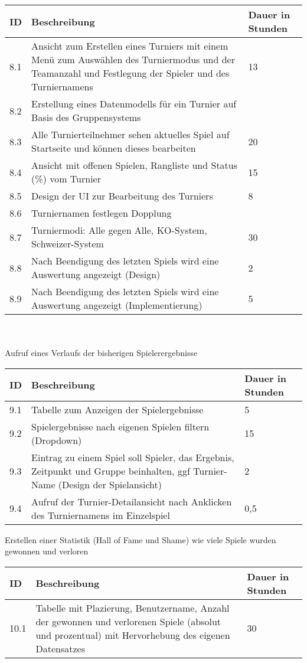 \begin{tabular}[h]{|p{1cm}|p{10cm}|p{3cm}|}
\hline 
ID & Beschreibung & Dauer in Stunden \\ \hline 
8.1	& Ansicht zum Erstellen eines Turniers mit einem Menü zum Auswählen des Turniermodus und der Teamanzahl und Festlegung der Spieler und des Turniernamens & 13\\ \hline
8.2	& Erstellung eines Datenmodells für ein Turnier auf Basis des Gruppensystems & \\ \hline
8.3	& Alle Turnierteilnehmer sehen aktuelles Spiel auf Startseite und können dieses bearbeiten & 20 \\ \hline
8.4 & Ansicht mit offenen Spielen, Rangliste und Status (\%) vom Turnier & 15 \\ \hline	
8.5 & Design der UI zur Bearbeitung des Turniers & 8 \\ \hline
8.6 & Turniernamen festlegen		Dopplung & \\ \hline
8.7 & Turniermodi: Alle gegen Alle, KO-System, Schweizer-System & 30 \\ \hline	
8.8 & Nach Beendigung des letzten Spiels wird eine Auswertung angezeigt (Design) & 2 \\ \hline	
8.9 & Nach Beendigung des letzten Spiels wird eine Auswertung angezeigt (Implementierung) & 5 \\ \hline
\end{tabular}\\ \\
Aufruf eines Verlaufs der bisherigen Spielerergebnisse\\
\begin{tabular}[h]{|p{1cm}|p{10cm}|p{3cm}|}
\hline 
ID & Beschreibung & Dauer in Stunden \\ \hline 
9.1 & Tabelle zum Anzeigen der Spielergebnisse & 5 \\ \hline	
9.2 & Spielergebnisse nach eigenen Spielen filtern (Dropdown) & 15	\\ \hline
9.3 & Eintrag zu einem Spiel soll Spieler, das Ergebnis, Zeitpunkt und Gruppe beinhalten, ggf Turnier-Name (Design der Spielansicht) & 2 \\ \hline	
9.4 & Aufruf der Turnier-Detailansicht nach Anklicken des Turniernamens im Einzelspiel & 0,5 \\ \hline
\end{tabular}\newpage
Erstellen einer Statistik (Hall of Fame und Shame) wie viele Spiele wurden gewonnen und verloren\\
\begin{tabular}[h]{|p{1cm}|p{10cm}|p{3cm}|}
\hline 
ID & Beschreibung & Dauer in Stunden \\ \hline 
10.1 & Tabelle mit Plazierung, Benutzername, Anzahl der gewonnen und verlorenen Spiele (absolut und prozentual) mit Hervorhebung des eigenen Datensatzes & 30 \\ \hline
\end{tabular}\\ \\
